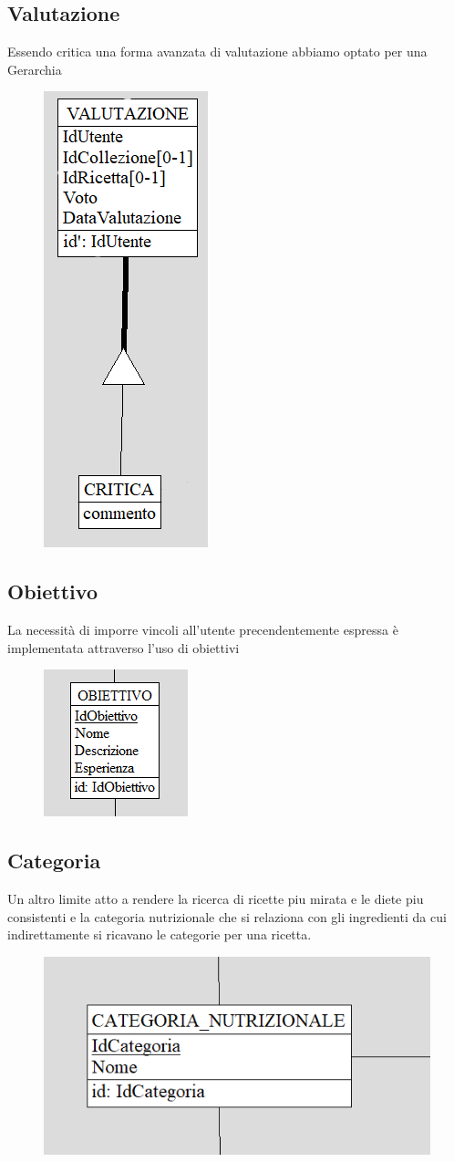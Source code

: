 ﻿\documentclass[a4paper,12pt]{report}
\begin{document}
\subsection{Valutazione}
Essendo critica una forma avanzata di valutazione
abbiamo optato per una Gerarchia
\begin{figure}[H]
    \centering
    \includegraphics[width=0.2\linewidth]{app_images/valutazione-concettuale.png}
\end{figure}
\subsection{Obiettivo}
La necessità di imporre vincoli all'utente precendentemente espressa
è implementata attraverso l'uso di obiettivi
\begin{figure}[H]
    \centering
    \includegraphics[width=0.45\linewidth]{app_images/obiettivo-concettuale.png}
\end{figure}
\subsection{Categoria}
Un altro limite atto a rendere la ricerca di ricette
piu mirata e le diete piu consistenti e la categoria nutrizionale
che si relaziona con gli ingredienti da cui indirettamente si ricavano le categorie
per una ricetta.
\begin{figure}[H]
    \centering
    \includegraphics[width=0.6\linewidth]{app_images/categoria-nutrizionale.png}
\end{figure}
\end{document}
